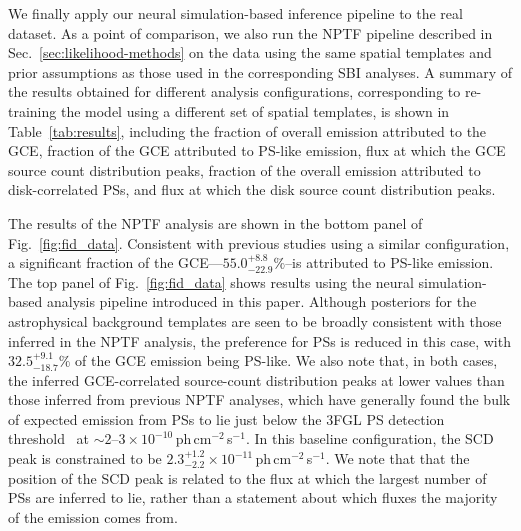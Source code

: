\documentclass[prd,aps,10pt,nofootinbib,twocolumn,superscriptaddress,preprintnumbers,balancelastpage,longbibliography]{revtex4-1}
\begin{document}
We finally apply our neural simulation-based inference pipeline to the real \Fermi dataset. As a point of comparison, we also run the NPTF pipeline described in Sec.~\ref{sec:likelihood-methods} on the data using the same spatial templates and prior assumptions as those used in the corresponding SBI analyses. A summary of the results obtained for different analysis configurations, corresponding to re-training the model using a different set of spatial templates, is shown in Table~\ref{tab:results}, including the fraction of overall emission attributed to the GCE, fraction of the GCE attributed to PS-like emission, flux at which the GCE source count distribution peaks, fraction of the overall emission attributed to disk-correlated PSs, and flux at which the disk source count distribution peaks.

The results of the NPTF analysis are shown in the bottom panel of Fig.~\ref{fig:fid_data}. Consistent with previous studies using a similar configuration, a significant fraction of the GCE---$55.0^{+8.8}_{-22.9}\%$--is attributed to PS-like emission.
The top panel of Fig.~\ref{fig:fid_data} shows results using the neural simulation-based analysis pipeline introduced in this paper. Although posteriors for the astrophysical background templates are seen to be broadly consistent with those inferred in the NPTF analysis, the preference for PSs is reduced in this case, with $32.5^{+9.1}_{-18.7}\%$ of the GCE emission being PS-like. We also note that, in both cases, the inferred GCE-correlated source-count distribution peaks at lower values than those inferred from previous NPTF analyses, which have generally found the bulk of expected emission from PSs to lie just below the 3FGL PS detection threshold~\cite{Lee:2015fea} at $\sim2$--$3\times 10^{-10}$\,ph\,cm$^{-2}$\,s$^{-1}$. In this baseline configuration, the SCD peak is constrained to be $2.3^{+1.2}_{-2.2}\times 10^{-11}$\,ph\,cm$^{-2}$\,s$^{-1}$. We note that that the position of the SCD peak is related to the flux at which the largest number of PSs are inferred to lie, rather than a statement about which fluxes the majority of the emission comes from.
\end{document}
